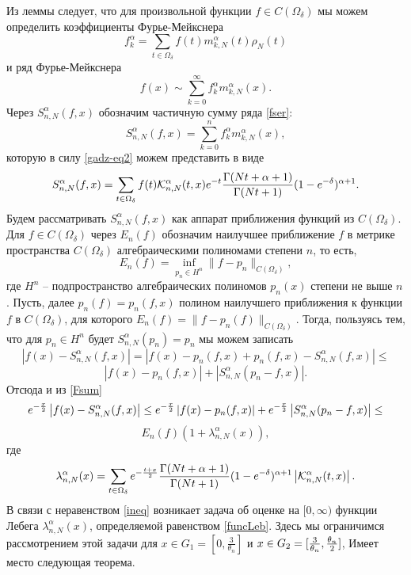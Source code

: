 Из леммы следует, что для произвольной функции $f\in C(\Omega_\delta)$ мы можем определить коэффициенты Фурье-Мейкснера
$$
f_k^{\alpha}=\sum_{t\in\Omega_\delta}f(t)m_{k,N}^\alpha(t)\rho_N(t)
$$
и ряд Фурье-Мейкснера
\begin{equation}\label{fser}
f(x)\sim\sum_{k=0}^{\infty}f_k^\alpha m_{k,N}^\alpha(x).
\end{equation}
Через $S^\alpha_{n,N}(f,x)$ обозначим частичную сумму ряда \eqref{fser}:
$$
S^\alpha_{n,N}(f,x)=\sum_{k=0}^{n}f_k^\alpha m_{k,N}^\alpha(x),
$$
которую в силу \eqref{gadz-eq2} можем представить в виде
\begin{equation}\label{Fsum}
S^\alpha_{n,N}(f,x)=\sum_{t\in\Omega_{\delta}}f(t)\mathcal{ K}_{n,N}^\alpha(t,x)e^{-t}{\Gamma(Nt+\alpha+1)\over\Gamma(Nt+1)}(1-e^{-\delta})^{\alpha+1}.
\end{equation}
Будем рассматривать $S^\alpha_{n,N}(f,x)$ как аппарат приближения функций из $C(\Omega_\delta)$.
Для $f\in C(\Omega_\delta)$ через $E_n(f)$ обозначим наилучшее приближение $f$ в метрике пространства
$ C(\Omega_\delta)$ алгебраическими полиномами степени $n$, то есть,
$$
E_n(f)=\inf_{p_n\in H^n}\|f-p_n\|_{C(\Omega_\delta)},
$$
где $H^n$ -- подпространство алгебраических полиномов $p_n(x)$ степени не выше $n$.
Пусть, далее $p_n(f)=p_n(f,x)$ полином наилучшего приближения к функции $f$ в $C(\Omega_\delta)$, для которого
$
E_n(f)=\|f-p_n(f)\|_{C(\Omega_\delta)}.
$
Тогда, пользуясь тем, что для $p_n\in H^n$ будет $S_{n,N}^\alpha(p_{n})=p_n$ мы можем записать
$$
\left|f(x)-S_{n,N}^\alpha(f,x)\right|=\left|f(x)-p_{n}(f,x)+p_{n}(f,x)-S_{n,N}^\alpha(f,x)\right|\leq
$$
$$
\left|f(x)-p_{n}(f,x)\right|+\left|S_{n,N}^\alpha(p_{n}-f,x)\right|.
$$
Отсюда и из \eqref{Fsum}
$$
e^{-{x\over 2}}\left|f(x)-S_{n,N}^\alpha(f,x)\right|\leq e^{-{x\over 2}}\left|f(x)-p_{n}(f,x)\right|+
e^{-{x\over 2}}\left|S_{n,N}^\alpha(p_{n}-f,x)\right|\leq
$$
\begin{equation}\label{ineq}
E_n(f)(1+\lambda_{n,N}^\alpha(x)),
\end{equation}
где
\begin{equation}\label{funcLeb}
\lambda_{n,N}^{\alpha}(x)=\sum_{t\in\Omega_{\delta}}e^{-{t+x\over 2}}{\Gamma(Nt+\alpha+1)\over\Gamma(Nt+1)}(1-e^{-\delta})^{\alpha+1}\left|\mathcal{ K}_{n,N}^\alpha(t,x)\right|.
\end{equation}
В связи с неравенством \eqref{ineq} возникает задача об оценке на $[0,\infty)$ функции Лебега $\lambda_{n,N}^{\alpha}(x)$, определяемой равенством \eqref{funcLeb}. Здесь мы ограничимся рассмотрением этой задачи для $x\in G_1=[0,\frac{3}{\theta_n}]$ и $x\in G_2=[\frac{3}{\theta_n},{\theta_n\over 2}]$,
Имеет место следующая теорема.

